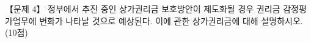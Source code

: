 \begin{longquestion}{【문제 4】}
정부에서 추진 중인 상가권리금 보호방안이 제도화될 경우 권리금 감정평가업무에 변화가 나타날 것으로 예상된다. 이에 관한 상가권리금에 대해 설명하시오. (10점) \par
\end{longquestion}
